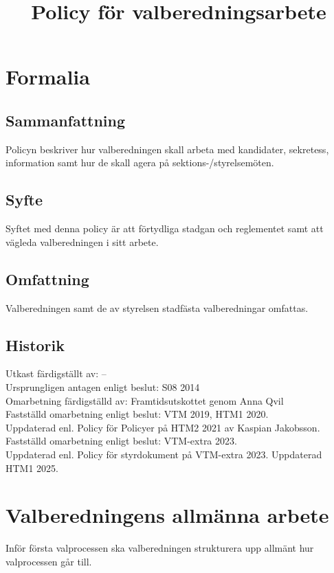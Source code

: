 \documentclass{dsekprotokoll}
\title{Policy för valberedningsarbete}
\author{}
\begin{document}
\maketitle

\section{Formalia}
\subsection{Sammanfattning}
Policyn beskriver hur valberedningen skall arbeta med kandidater,
sekretess, information samt
hur de skall agera på sektions-/styrelsemöten.

\subsection{Syfte}
Syftet med denna policy är att förtydliga stadgan och reglementet
samt att vägleda valberedningen i sitt arbete.

\subsection{Omfattning}
Valberedningen samt de av styrelsen stadfästa valberedningar omfattas.

\subsection{Historik}
Utkast färdigställt av: – \\
Ursprungligen antagen enligt beslut: S08 2014\\
Omarbetning färdigställd av: Framtidsutskottet genom Anna Qvil\\
Fastställd omarbetning enligt beslut: VTM 2019, HTM1 2020. \\
Uppdaterad enl. Policy för Policyer på HTM2 2021 av Kaspian Jakobsson.\\
Fastställd omarbetning enligt beslut: VTM-extra 2023.\\
Uppdaterad enl. Policy för styrdokument på VTM-extra 2023.
Uppdaterad HTM1 2025.

\section{Valberedningens allmänna arbete}

Inför första valprocessen ska valberedningen strukturera upp allmänt
hur valprocessen går till.
\end{document}
